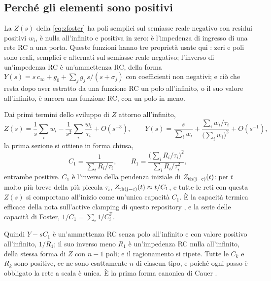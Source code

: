 \documentclass[10pt,a4paper]{scrartcl}
\let\newcommand\fcitdefine
\newcommand{\Zjc}{Z_\mathrm{th(j-c)}}
\begin{document}
\subsection{Perché gli elementi sono positivi}
\label{sec:positive}
La $Z(s)$ della \eqref{eq:zfoster} ha poli semplici sul semiasse reale negativo con residui positivi $w_i$, è nulla all'infinito e positiva in zero: è l'impedenza di ingresso di una rete RC a una porta. Queste funzioni hanno tre proprietà usate qui \cite{foster1924,cauer1926,guillemin1957}: zeri e poli sono reali, semplici e alternati sul semiasse reale negativo; l'inverso di un'impedenza RC è un'ammettenza RC, della forma $Y(s) = s\,c_\infty + g_0 + \sum_j g_j\, s/(s+\sigma_j)$ con coefficienti non negativi; e ciò che resta dopo aver estratto da una funzione RC un polo all'infinito, o il suo valore all'infinito, è ancora una funzione RC, con un polo in meno.

Dai primi termini dello sviluppo di $Z$ attorno all'infinito,
\begin{equation}
Z(s) = \frac{1}{s}\sum_i w_i - \frac{1}{s^2}\sum_i \frac{w_i}{\tau_i} + O\!\left(s^{-3}\right) , \qquad
Y(s) = \frac{s}{\sum_i w_i} + \frac{\sum_i w_i/\tau_i}{\bigl(\sum_i w_i\bigr)^2} + O\!\left(s^{-1}\right) ,
\end{equation}
la prima sezione si ottiene in forma chiusa,
\begin{equation}
C_1 = \frac{1}{\sum_i R_i/\tau_i} , \qquad R_1 = \frac{\bigl(\sum_i R_i/\tau_i\bigr)^2}{\sum_i R_i/\tau_i^2} ,
\label{eq:first}
\end{equation}
entrambe positive. $C_1$ è l'inverso della pendenza iniziale di $\Zjc(t)$: per $t$ molto più breve della più piccola $\tau_i$, $\Zjc(t) \approx t/C_1$, e tutte le reti con questa $Z(s)$ si comportano all'inizio come un'unica capacità $C_1$. È la capacità termica efficace della nota sull'active clamping di questo repository \cite{activeclamping}, e la serie delle capacità di Foster, $1/C_1 = \sum_i 1/C_i^\mathrm{F}$.

Quindi $Y - sC_1$ è un'ammettenza RC senza polo all'infinito e con valore positivo all'infinito, $1/R_1$; il suo inverso meno $R_1$ è un'impedenza RC nulla all'infinito, della stessa forma di $Z$ con $n-1$ poli; e il ragionamento si ripete. Tutte le $C_k$ e $R_k$ sono positive, ce ne sono esattamente $n$ di ciascun tipo, e poiché ogni passo è obbligato la rete a scala è unica. È la prima forma canonica di Cauer \cite{cauer1926}.
\end{document}
